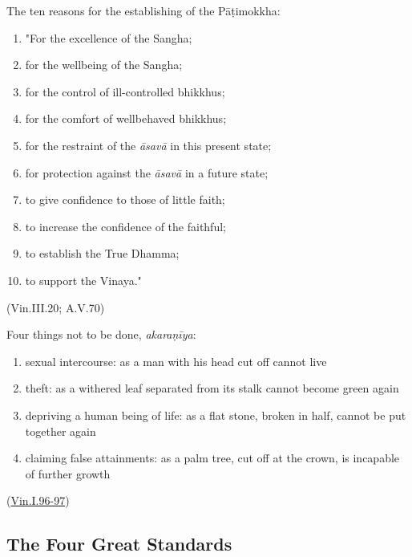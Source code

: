 \begin{multicols}{2}

The ten reasons for the establishing of the Pāṭimokkha:

\begin{enumerate}
\def\labelenumi{\arabic{enumi}.}
\tightlist
\item
  "For the excellence of the Sangha;
\item
  for the wellbeing of the Sangha;
\item
  for the control of ill-controlled bhikkhus;
\item
  for the comfort of wellbehaved bhikkhus;
\item
  for the restraint of the \emph{āsavā} in this present state;
\item
  for protection against the \emph{āsavā} in a future state;
\item
  to give confidence to those of little faith;
\item
  to increase the confidence of the faithful;
\item
  to establish the True Dhamma;
\item
  to support the Vinaya."
\end{enumerate}

(Vin.III.20; A.V.70)

\columnbreak

Four things not to be done, \emph{akaraṇīya}:

\begin{enumerate}
\def\labelenumi{\arabic{enumi}.}
\tightlist
\item
  sexual intercourse: as a man with his head cut off cannot live
\item
  theft: as a withered leaf separated from its stalk cannot become green
  again
\item
  depriving a human being of life: as a flat stone, broken in half,
  cannot be put together again
\item
  claiming false attainments: as a palm tree, cut off at the crown, is
  incapable of further growth
\end{enumerate}

(\href{https://suttacentral.net/pli-tv-kd1/en/horner-brahmali}{Vin.I.96-97})

\end{multicols}
\par
\clearpage


\subsection{The Four Great Standards}

